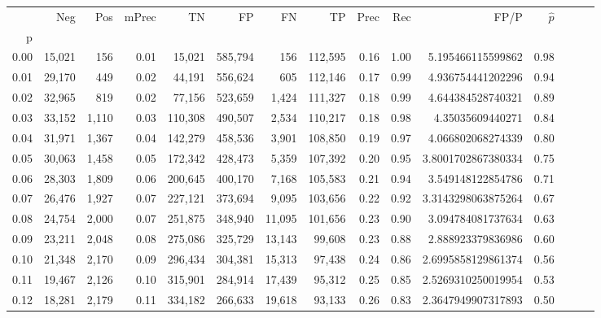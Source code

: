 \begin{tabular}{rrrrrrrrrrrrrrr}
\toprule
{} &     Neg &    Pos & mPrec &       TN &       FP &       FN &       TP &  Prec &   Rec &                  FP/P & $\hat{p}$ \\
p    &         &        &       &          &          &          &          &       &       &                       &           \\
\midrule
0.00 &  15,021 &    156 &  0.01 &   15,021 &  585,794 &      156 &  112,595 &  0.16 &  1.00 &     5.195466115599862 &      0.98 \\
0.01 &  29,170 &    449 &  0.02 &   44,191 &  556,624 &      605 &  112,146 &  0.17 &  0.99 &     4.936754441202296 &      0.94 \\
0.02 &  32,965 &    819 &  0.02 &   77,156 &  523,659 &    1,424 &  111,327 &  0.18 &  0.99 &     4.644384528740321 &      0.89 \\
0.03 &  33,152 &  1,110 &  0.03 &  110,308 &  490,507 &    2,534 &  110,217 &  0.18 &  0.98 &      4.35035609440271 &      0.84 \\
0.04 &  31,971 &  1,367 &  0.04 &  142,279 &  458,536 &    3,901 &  108,850 &  0.19 &  0.97 &     4.066802068274339 &      0.80 \\
0.05 &  30,063 &  1,458 &  0.05 &  172,342 &  428,473 &    5,359 &  107,392 &  0.20 &  0.95 &    3.8001702867380334 &      0.75 \\
0.06 &  28,303 &  1,809 &  0.06 &  200,645 &  400,170 &    7,168 &  105,583 &  0.21 &  0.94 &     3.549148122854786 &      0.71 \\
0.07 &  26,476 &  1,927 &  0.07 &  227,121 &  373,694 &    9,095 &  103,656 &  0.22 &  0.92 &    3.3143298063875264 &      0.67 \\
0.08 &  24,754 &  2,000 &  0.07 &  251,875 &  348,940 &   11,095 &  101,656 &  0.23 &  0.90 &     3.094784081737634 &      0.63 \\
0.09 &  23,211 &  2,048 &  0.08 &  275,086 &  325,729 &   13,143 &   99,608 &  0.23 &  0.88 &     2.888923379836986 &      0.60 \\
0.10 &  21,348 &  2,170 &  0.09 &  296,434 &  304,381 &   15,313 &   97,438 &  0.24 &  0.86 &    2.6995858129861374 &      0.56 \\
0.11 &  19,467 &  2,126 &  0.10 &  315,901 &  284,914 &   17,439 &   95,312 &  0.25 &  0.85 &    2.5269310250019954 &      0.53 \\
0.12 &  18,281 &  2,179 &  0.11 &  334,182 &  266,633 &   19,618 &   93,133 &  0.26 &  0.83 &    2.3647949907317893 &      0.50 \\

\end{tabular}
